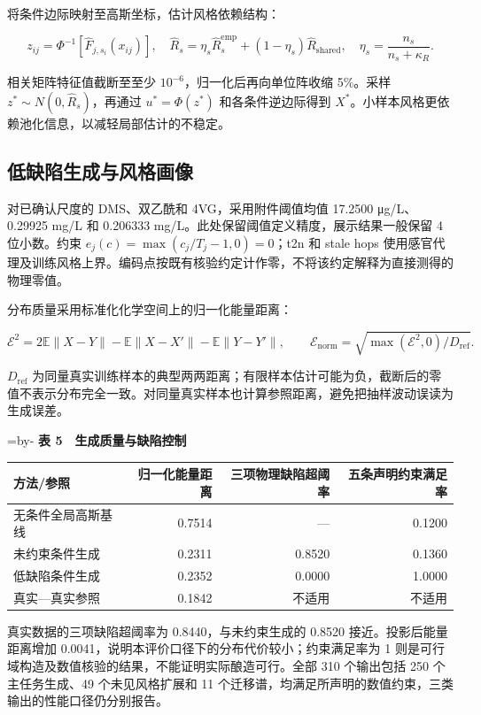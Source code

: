 \documentclass[
  chinese,
  11pt,
]{article}
\makeatletter
\newcounter{none} %
\newcommand{\EnsureSpace}[1]{\par\begingroup\@tempdima=\pagegoal\advance\@tempdima by-\pagetotal\ifdim\@tempdima<#1\newpage\fi\endgroup}
\makeatother
\begin{document}
将条件边际映射至高斯坐标，估计风格依赖结构：

\[
z_{ij}=\Phi^{-1}[\widehat F_{j,s_i}(x_{ij})],\quad
\widehat R_s=\eta_s\widehat R_s^{\mathrm{emp}}+(1-\eta_s)\widehat R_{\mathrm{shared}},
\quad \eta_s=\frac{n_s}{n_s+\kappa_R}.
\]

相关矩阵特征值截断至至少 \(10^{-6}\)，归一化后再向单位阵收缩 5\%。采样
\(z^*\sim N(0,\widehat R_s)\)，再通过 \(u^*=\Phi(z^*)\)
和各条件逆边际得到
\(X^*\)。小样本风格更依赖池化信息，以减轻局部估计的不稳定。

\subsection{低缺陷生成与风格画像}\label{ux4f4eux7f3aux9677ux751fux6210ux4e0eux98ceux683cux753bux50cf}

对已确认尺度的 DMS、双乙酰和 4VG，采用附件阈值均值 17.2500 μg/L、0.29925
mg/L 和 0.206333 mg/L。此处保留阈值定义精度，展示结果一般保留 4
位小数。约束 \(e_j(c)=\max(c_j/T_j-1,0)=0\)；t2n 和 stale hops
使用感官代理及训练风格上界。编码点按既有核验约定计作零，不将该约定解释为直接测得的物理零值。

分布质量采用标准化化学空间上的归一化能量距离：

\[
\mathcal E^2=2\mathbb E\|X-Y\|-\mathbb E\|X-X'\|-\mathbb E\|Y-Y'\|,
\qquad \mathcal E_{\mathrm{norm}}=\sqrt{\max(\mathcal E^2,0)/D_{\mathrm{ref}}}.
\]

\(D_{\mathrm{ref}}\)
为同量真实训练样本的典型两两距离；有限样本估计可能为负，截断后的零值不表示分布完全一致。对同量真实样本也计算参照距离，避免把抽样波动误读为生成误差。

\EnsureSpace{6\baselineskip}
\textbf{表 5　生成质量与缺陷控制}

{\def\LTcaptype{none} %
\begin{longtable}[]{@{}lrrr@{}}
\toprule\noalign{}
方法/参照 & 归一化能量距离 & 三项物理缺陷超阈率 & 五条声明约束满足率 \\
\midrule\noalign{}
\endhead
\bottomrule\noalign{}
\endlastfoot
无条件全局高斯基线 & 0.7514 & --- & 0.1200 \\
未约束条件生成 & 0.2311 & 0.8520 & 0.1360 \\
低缺陷条件生成 & 0.2352 & 0.0000 & 1.0000 \\
真实---真实参照 & 0.1842 & 不适用 & 不适用 \\
\end{longtable}
}

真实数据的三项缺陷超阈率为 0.8440，与未约束生成的 0.8520
接近。投影后能量距离增加
0.0041，说明本评价口径下的分布代价较小；约束满足率为 1
则是可行域构造及数值核验的结果，不能证明实际酿造可行。全部 310
个输出包括 250 个主任务生成、49 个未见风格扩展和 11
个迁移谱，均满足所声明的数值约束，三类输出的性能口径仍分别报告。
\end{document}
